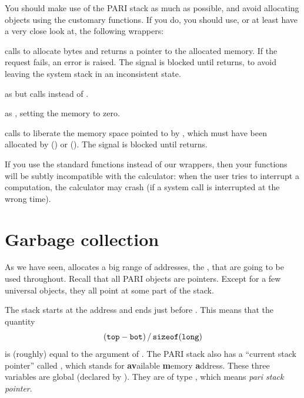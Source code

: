 You should make use of the PARI stack as much as possible, and avoid
allocating objects using the customary functions. If you do, you should
use, or at least have a very close look at, the following wrappers:

 calls  to allocate
 bytes and returns a pointer to the allocated memory. If the
request fails, an error is raised. The  signal is blocked until
 returns, to avoid leaving the system stack in an inconsistent
state.

 as  but
calls  instead of .

 as , setting the
memory to zero.

 calls  to liberate the memory space
pointed to by , which must have been allocated by 
() or  (). The  signal
is blocked until  returns.

If you use the standard  functions instead of our wrappers, then
your functions will be subtly incompatible with the  calculator: when
the user tries to interrupt a computation, the calculator may crash
(if a system call is interrupted at the wrong time).

\section{Garbage collection}\label{se:garbage}


\noindent
As we have seen,  allocates a big range of
addresses, the , that are going to be used throughout. Recall
that all PARI objects are pointers. Except for a few universal objects,
they all point at some part of the stack.

The stack starts at the address  and ends just before . This
means that the quantity
%
$$ ({\tt top} - {\tt bot})\,/\,{\tt sizeof(long)} $$
%
is (roughly) equal to the  argument of . The PARI
stack also has a ``current stack pointer'' called , which stands
for {\bf av}ailable {\bf m}emory {\bf a}ddress. These three variables are
global (declared by ). They are of type , which
means \emph{pari stack pointer}.

